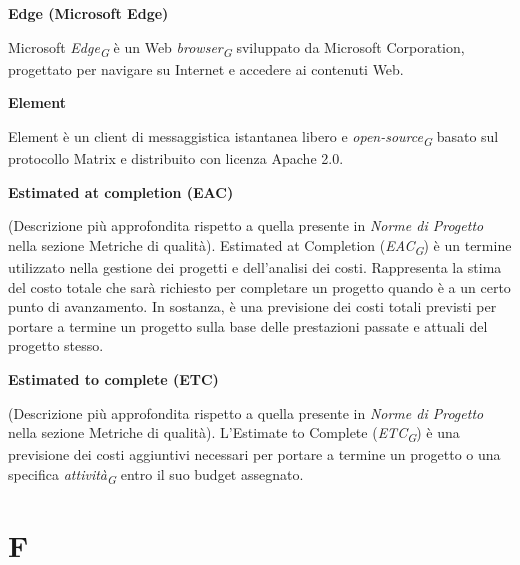 \documentclass{article}
\begin{document}
\vspace{0.4cm}

\textbf{Edge (Microsoft Edge)}

\vspace{0.1cm}

Microsoft \textit{Edge}\textsubscript{\textit{G}} è un Web \textit{browser}\textsubscript{\textit{G}} sviluppato da Microsoft Corporation, progettato per navigare su Internet e accedere ai contenuti Web.

\vspace{0.4cm}

\textbf{Element}

\vspace{0.1cm}

Element è un client di messaggistica istantanea libero e \textit{open-source}\textsubscript{\textit{G}} basato sul protocollo Matrix e distribuito con licenza Apache 2.0.

\vspace{0.4cm}

\textbf{Estimated at completion (EAC)}

\vspace{0.1cm}

(Descrizione più approfondita rispetto a quella presente in \textit{Norme di Progetto} nella sezione Metriche di qualità). Estimated at Completion (\textit{EAC}\textsubscript{\textit{G}}) è un termine utilizzato nella gestione dei progetti e dell'analisi dei costi. Rappresenta la stima del costo totale che sarà richiesto per completare un progetto quando è a un certo punto di avanzamento. In sostanza, è una previsione dei costi totali previsti per portare a termine un progetto sulla base delle prestazioni passate e attuali del progetto stesso.

\vspace{0.4cm}

\textbf{Estimated to complete (ETC)}

\vspace{0.1cm}

(Descrizione più approfondita rispetto a quella presente in \textit{Norme di Progetto} nella sezione Metriche di qualità). L'Estimate to Complete (\textit{ETC}\textsubscript{\textit{G}}) è una previsione dei costi aggiuntivi necessari per portare a termine un progetto o una specifica \textit{attività}\textsubscript{\textit{G}} entro il suo budget assegnato.

\pagebreak
\section*{F}
{}
\end{document}

